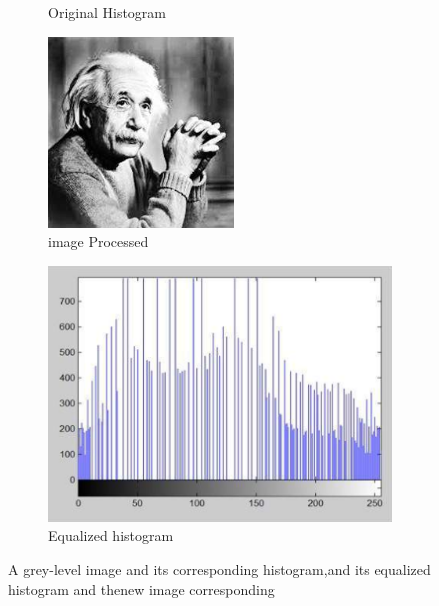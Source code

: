 \begin{figure}[h]
\begin{subfigure}[b]{0.5\textwidth}
                        \caption{Original Histogram}
                \end{subfigure}
                \hfill
                \begin{subfigure}[b]{0.3\textwidth}
                        \centering
                        \includegraphics[width=\textwidth]{chapiter1/figures/equa-processed-image.png}
                        \caption{image Processed}
                \end{subfigure}
                \hfill
                \begin{subfigure}[b]{0.5\textwidth}
                        \centering
                        \includegraphics[width=\textwidth]{chapiter1/figures/equa-original-hist.png}
                        \caption{Equalized histogram}
                \end{subfigure}
                \caption{A grey-level image and its corresponding histogram,and its equalized histogram and thenew image corresponding}
        \end{figure}


